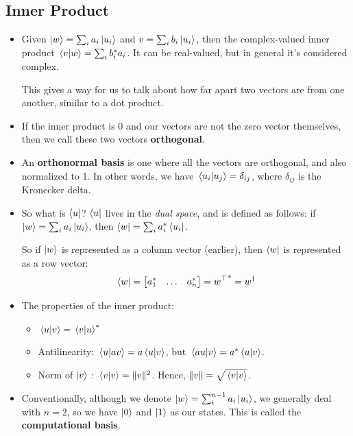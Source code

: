 \subsection{Inner Product}
\begin{itemize}
	\item Given \( \ket{w} = \sum_i a_i \ket{u_i} \) and \( v = \sum_i b_i \ket{u_i} \), then the complex-valued 
		inner product \( \braket*{v}{w} = \sum_i b_i^* a_i\). It can be real-valued, but in general it's considered
		complex. 

		This gives a way for us to talk about how far apart two vectors are from one another, similar to a dot
		product. 
	\item If the inner product is 0 and our vectors are not the zero vector themselves, then we call these two vectors 
		\textbf{orthogonal}.
	\item An \textbf{orthonormal basis} is one where all the vectors are orthogonal, and also normalized to 1. In other
		words, we have \( \braket*{u_i}{u_j} = \delta_{ij} \), where \( \delta_{ij} \) is the Kronecker delta. 
	\item So what is \( \bra{u} \)? \( \bra u \) lives in the \textit{dual space}, and is defined as follows: if 
		\( \ket{w} = \sum_i a_i \ket{u_i} \), then \( \bra{w} = \sum_i a_i^* \bra{u_i} \). 

		So if \(  \ket{w} \) is represented as a column vector (earlier), then \( \bra{w} \) is represented as a 
		row vector:
		\[
			\bra{w} = \begin{bmatrix} a_1^* & \hdots & a_n^* \end{bmatrix} = {w^\top}^* = w^{\dagger}
		\] 
	\item The properties of the inner product:
		\begin{itemize}
			\item \( \braket*{u}{v} = \braket*{v}{u}^* \) 
			\item Antilinearity: \( \braket*{u}{av} = a\braket*{u}{v} \), but
				\( \braket*{au}{v} = a^*\braket*{u}{v} \). 
			\item Norm of \( \ket{v} \) : \( \braket*{v}{v} = \|v\|^2 \). Hence, \( \|v\| = \sqrt{\braket*{v}{v}}  \).
		\end{itemize}
	\item Conventionally, although we denote \( \ket{w} = \sum_i^{n - 1}a_i \ket{u_i} \), we generally deal with 
		\( n = 2 \), so we have \( \ket{0} \) and \( \ket{1} \) as our states. This is called the \textbf{computational
		basis}.
\end{itemize}
